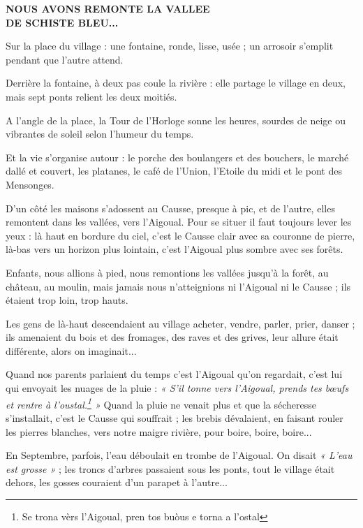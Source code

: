 
\begin{center}
{\Large\bfseries NOUS AVONS REMONTE LA VALLEE\\[0.8em]
DE SCHISTE BLEU...}
\end{center}

\vspace{3.0em}

Sur la place du village : une fontaine, ronde, lisse, usée ; un arrosoir s’emplit pendant que
l’autre attend.

Derrière la fontaine, à deux pas coule la rivière : elle partage le village en deux, mais sept
ponts relient les deux moitiés.

A l’angle de la place, la Tour de l’Horloge sonne les heures, sourdes de neige ou vibrantes de
soleil selon l’humeur du temps.

Et la vie s’organise autour : le porche des boulangers et des bouchers, le marché dallé et
couvert, les platanes, le café de l’Union, l’Etoile du midi et le pont des Mensonges.

D’un côté les maisons s’adossent au Causse, presque à pic, et de l’autre, elles remontent dans
les vallées, vers l’Aigoual. Pour se situer il faut toujours lever les yeux : là haut en bordure du
ciel, c’est le Causse clair avec sa couronne de pierre, là-bas vers un horizon plus lointain, c’est
l’Aigoual plus sombre avec ses forêts.

Enfants, nous allions à pied, nous remontions les vallées jusqu’à la forêt, au château, au
moulin, mais jamais nous n’atteignions ni l’Aigoual ni le Causse ; ils étaient trop loin, trop
hauts.

Les gens de là-haut descendaient au village acheter, vendre, parler, prier, danser ; ils
amenaient du bois et des fromages, des raves et des grives, leur allure était différente, alors on
imaginait...

Quand nos parents parlaient du temps c’est l’Aigoual qu’on regardait, c’est lui qui envoyait
les nuages de la pluie : \textit{« S’il tonne vers l’Aigoual, prends tes bœufs et rentre à l’oustal.\footnote{Se trona vèrs l'Aigoual, pren tos buòus e torna a l'ostal} »}
Quand la pluie ne venait plus et que la sécheresse s’installait, c’est le Causse qui souffrait ; les
brebis dévalaient, en faisant rouler les pierres blanches, vers notre maigre rivière, pour boire,
boire, boire...

En Septembre, parfois, l’eau déboulait en trombe de l’Aigoual. On disait \textit{« L’eau est
grosse »} ; les troncs d’arbres passaient sous les ponts, tout le village était dehors, les gosses
couraient d’un parapet à l’autre...

